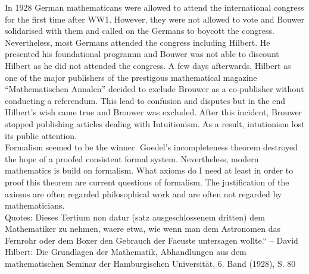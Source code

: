 \documentclass[hidelinks]{article}
\theoremstyle{plain}
\theoremstyle{definition}
\theoremstyle{rem}
\begin{document}
In 1928 German mathematicans were allowed to attend the international congress for the first time after WW1. However, they were not allowed to vote and Bouwer solidarised with them and called on the Germans to boycott the congress. Nevertheless, most Germans attended the congress including Hilbert. He presented his foundational programm and Bouwer was not able to discount Hilbert as he did not attended the congress. A few days afterwards, Hilbert as one of the major publishers of the prestigous mathematical magazine ``Mathematischen Annalen'' decided to exclude Brouwer as a co-publisher without conducting a referendum. This lead to confusion and disputes but in the end Hilbert's wish came true and Brouwer was excluded. After this incident, Brouwer stopped publishing articles dealing with Intuitionism. As a result, intutionism lost its public attention. \\

Formalism seemed to be the winner. Goedel's incompleteness theorem destroyed the hope of a proofed consistent formal system. Nevertheless, modern mathematics is build on formalism. What axioms do I need at least in order to proof this theorem are current questions of formalism. The justification of the axioms are often regarded philosophical work and are often not regarded by mathematicians.
\\

Quotes: 
Dieses Tertium non datur (satz ausgeschlossenem dritten) dem Mathematiker zu nehmen, waere etwa, wie wenn man dem Astronomen das Fernrohr oder dem Boxer den Gebrauch der Faeuste untersagen wollte.“ – David Hilbert: Die Grundlagen der Mathematik, Abhandlungen aus dem mathematischen Seminar der Hamburgischen Universität, 6. Band (1928), S. 80

\newpage


\end{document}
